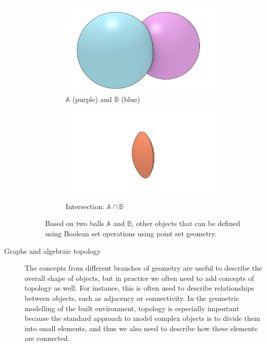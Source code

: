 \begin{description}
\begin{figure}[b]
\centering
\begin{subfigure}[b]{0.45\linewidth}
\includegraphics[width=\linewidth]{figs/boolean}
\caption{$\mathbb{A}$ (purple) and $\mathbb{B}$ (blue)}%
\label{subfig:boolean}
\end{subfigure}
\begin{subfigure}[b]{0.45\linewidth}
\includegraphics[width=\linewidth]{figs/boolean-intersection}
\caption{Intersection: $\mathbb{A} \cap \mathbb{B}$}%
\label{subfig:boolean-intersection}
\end{subfigure}
\caption{Based on two balls $\mathbb{A}$ and $\mathbb{B}$, other objects that can be defined using Boolean set operations using point set geometry.}%
\label{fig:boolean}
\end{figure}

\item[Graphs and algebraic topology]
The concepts from different branches of geometry are useful to describe the overall shape of objects, but in practice we often need to add concepts of topology as well.
For instance, this is often used to describe relationships between objects, such as adjacency or connectivity.
In the geometric modelling of the built environment, topology is especially important because the standard approach to model complex objects is to divide them into small elements, and thus we also need to describe how these elements are connected.


\end{description}
